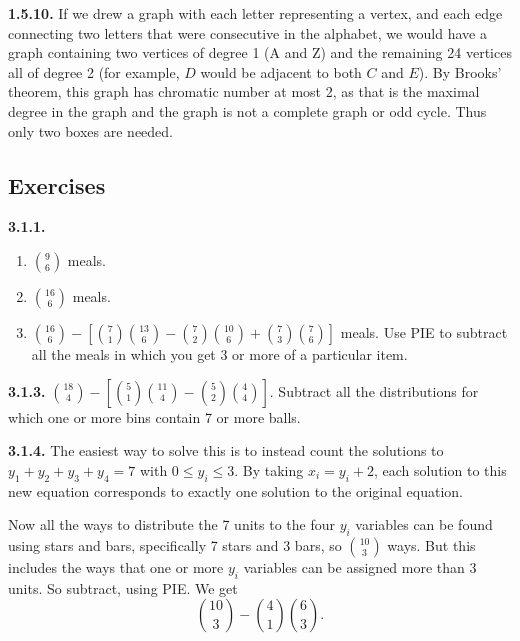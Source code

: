 \documentclass[10pt,]{book}
\theoremstyle{plain}
\theoremstyle{definition}
\theoremstyle{definition}
\theoremstyle{definition}
\theoremstyle{definition}
\numberwithin{equation}{chapter}
\begin{document}
\par\smallskip
\noindent\textbf{1.5.10.} \hypertarget{p-371}{}%
If we drew a graph with each letter representing a vertex, and each edge connecting two letters that were consecutive in the alphabet, we would have a graph containing two vertices of degree 1 (A and Z) and the remaining 24 vertices all of degree 2 (for example, \(D\) would be adjacent to both \(C\) and \(E\)). By Brooks' theorem, this graph has chromatic number at most 2, as that is the maximal degree in the graph and the graph is not a complete graph or odd cycle. Thus only two boxes are needed.%
\par\smallskip
\subsection*{ Exercises}
\noindent\textbf{3.1.1.} \hypertarget{p-922}{}%
\leavevmode%
\begin{enumerate}[label=(\alph*)]
\item\hypertarget{li-151}{}\({9 \choose 6}\) meals.%
\item\hypertarget{li-152}{}\({16 \choose 6}\) meals.%
\item\hypertarget{li-153}{}\({16 \choose 6} - \left[{7 \choose 1}{13 \choose 6} - {7 \choose 2}{10 \choose 6} + {7 \choose 3}{7 \choose 6}\right]\) meals.  Use PIE to subtract all the meals in which you get 3 or more of a particular item.%
\end{enumerate}
%
\par\smallskip
\noindent\textbf{3.1.3.} \hypertarget{p-928}{}%
\({18 \choose 4} - \left[ {5 \choose 1}{11 \choose 4} - {5 \choose 2}{4 \choose 4}\right]\). Subtract all the distributions for which one or more bins contain 7 or more balls.%
\par\smallskip
\noindent\textbf{3.1.4.} \hypertarget{p-930}{}%
The easiest way to solve this is to instead count the solutions to \(y_1 + y_2 + y_3 + y_4 = 7\) with \(0 \le y_i \le 3\). By taking \(x_i = y_i+2\), each solution to this new equation corresponds to exactly one solution to the original equation.%
\par
\hypertarget{p-931}{}%
Now all the ways to distribute the 7 units to the four \(y_i\) variables can be found using stars and bars, specifically 7 stars and 3 bars, so \({10 \choose 3}\) ways. But this includes the ways that one or more \(y_i\) variables can be assigned more than 3 units. So subtract, using PIE. We get%
\begin{equation*}
{10 \choose 3} - {4\choose 1} {6 \choose 3}.
\end{equation*}
\end{document}
